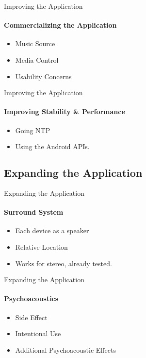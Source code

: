 \begin{frame}{Improving the Application}
    \framesubtitle{Commercializing the Application}
    \begin{itemize}
        \item Music Source
        \item Media Control
        \item Usability Concerns
    \end{itemize}
\end{frame}

\begin{frame}{Improving the Application}
    \framesubtitle{Improving Stability \& Performance}
    \begin{itemize}
        \item Going NTP %
        \item Using the Android APIs. %
    \end{itemize}
\end{frame}

\subsection{Expanding the Application}
\begin{frame}{Expanding the Application}
    \framesubtitle{Surround System}
    \begin{itemize}
        \item Each device as a speaker
        \item Relative Location
        \item Works for stereo, already tested.
    \end{itemize}
\end{frame}

\begin{frame}{Expanding the Application}
    \framesubtitle{Psychoacoustics}
    \begin{itemize}
        \item Side Effect
        \item Intentional Use %
        \item Additional Psychoacoustic Effects
    \end{itemize}
\end{frame}

